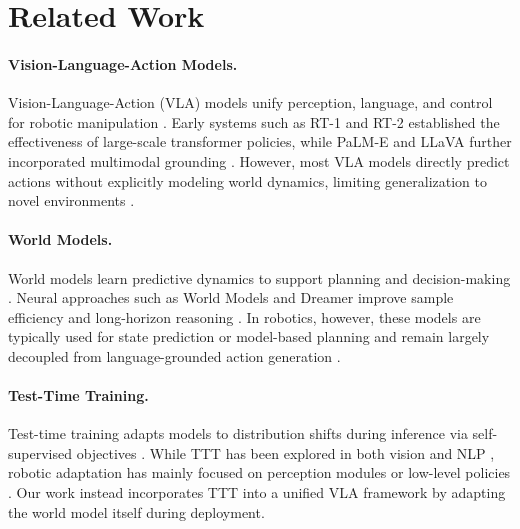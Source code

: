 \section{Related Work}
\paragraph{Vision-Language-Action Models.}
Vision-Language-Action (VLA) models unify perception, language, and control for robotic manipulation \citep{sapkota2025visionlanguageactionmodelsconceptsprogress,din2025visionlanguageactionmodels}. 
Early systems such as RT-1 and RT-2 established the effectiveness of large-scale transformer policies, while PaLM-E and LLaVA further incorporated multimodal grounding \citep{brohan2023rt1roboticstransformerrealworld,zitkovich2023rt,driess2023palm,liu2023visual}. 
However, most VLA models directly predict actions without explicitly modeling world dynamics, limiting generalization to novel environments \citep{zhang2025inspirevisionlanguageactionmodelsintrinsic}.

\paragraph{World Models.}
World models learn predictive dynamics to support planning and decision-making \citep{sutton1990integrated,hafner2025mastering}. 
Neural approaches such as World Models and Dreamer improve sample efficiency and long-horizon reasoning \citep{ha2018world,hafner2022masteringataridiscreteworld,hafner2025mastering}. 
In robotics, however, these models are typically used for state prediction or model-based planning and remain largely decoupled from language-grounded action generation \citep{sakagami2023robotic, wang2026vagen}.

\paragraph{Test-Time Training.}
Test-time training adapts models to distribution shifts during inference via self-supervised objectives \citep{sun2020testtimetrainingselfsupervisiongeneralization,ma2024improved}. 
While TTT has been explored in both vision and NLP \citep{ye2023robustquestionansweringdistribution}, robotic adaptation has mainly focused on perception modules or low-level policies \citep{zhao2020sim}. 
Our work instead incorporates TTT into a unified VLA framework by adapting the world model itself during deployment.
